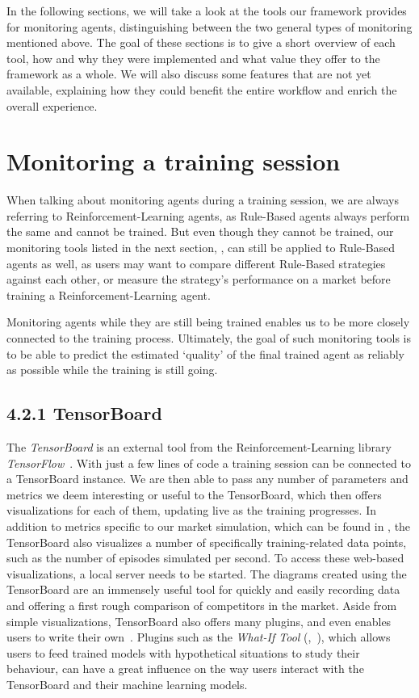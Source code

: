 In the following sections, we will take a look at the tools our framework provides for monitoring agents, distinguishing between the two general types of monitoring mentioned above. The goal of these sections is to give a short overview of each tool, how and why they were implemented and what value they offer to the framework as a whole. We will also discuss some features that are not yet available, explaining how they could benefit the entire workflow and enrich the overall experience.

\section{Monitoring a training session}

When talking about monitoring agents during a training session, we are always referring to Reinforcement-Learning agents, as Rule-Based agents always perform the same and cannot be trained. But even though they cannot be trained, our monitoring tools listed in the next section, , can still be applied to Rule-Based agents as well, as users may want to compare different Rule-Based strategies against each other, or measure the strategy's performance on a market before training a Reinforcement-Learning agent.

Monitoring agents while they are still being trained enables us to be more closely connected to the training process. Ultimately, the goal of such monitoring tools is to be able to predict the estimated `quality' of the final trained agent as reliably as possible while the training is still going.

\subsection*{4.2.1 TensorBoard}\label{subsec:TensorBoard}

The \emph{TensorBoard} is an external tool from the Reinforcement-Learning library \emph{TensorFlow}~\cite{TensorFlow}. With just a few lines of code a training session can be connected to a TensorBoard instance. We are then able to pass any number of parameters and metrics we deem interesting or useful to the TensorBoard, which then offers visualizations for each of them, updating live as the training progresses. In addition to metrics specific to our market simulation, which can be found in , the TensorBoard also visualizes a number of specifically training-related data points, such as the number of episodes simulated per second. To access these web-based visualizations, a local server needs to be started. The diagrams created using the TensorBoard are an immensely useful tool for quickly and easily recording data and offering a first rough comparison of competitors in the market. Aside from simple visualizations, TensorBoard also offers many plugins, and even enables users to write their own~\cite{TensorBoardPlugins}. Plugins such as the \emph{What-If Tool} (\cite{WhatIfTool},~\cite{WhatIfToolWeb}), which allows users to feed trained models with hypothetical situations to study their behaviour, can have a great influence on the way users interact with the TensorBoard and their machine learning models.

